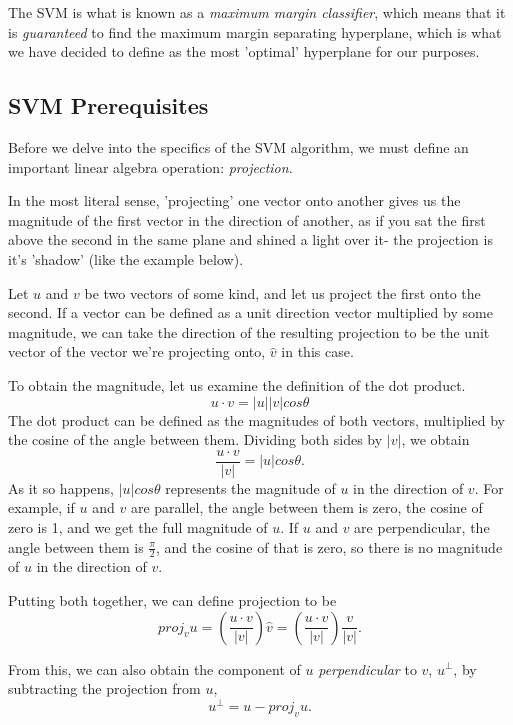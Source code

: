 The SVM is what is known as a \textit{maximum margin classifier}, which means that it is \textit{guaranteed} to find the maximum margin separating hyperplane, which is what we have decided to define as the most 'optimal' hyperplane for our purposes.

\subsection{SVM Prerequisites}
Before we delve into the specifics of the SVM algorithm, we must define an important linear algebra operation: \textit{projection}.

In the most literal sense, 'projecting' one vector onto another gives us the magnitude of the first vector in the direction of another, as if you sat the first above the second in the same plane and shined a light over it- the projection is it's 'shadow' (like the example below).


Let $u$ and $v$ be two vectors of some kind, and let us project the first onto the second. If a vector can be defined as a unit direction vector multiplied by some magnitude, we can take the direction of the resulting projection to be the unit vector of the vector we're projecting onto, $\hat{v}$ in this case.

To obtain the magnitude, let us examine the definition of the dot product.
\[
    u \cdot v = |u||v|cos\theta
\]
The dot product can be defined as the magnitudes of both vectors, multiplied by the cosine of the angle between them. Dividing both sides by $|v|$, we obtain
\[
    \frac{u \cdot v}{|v|} = |u|cos\theta.
\]
As it so happens, $|u|cos\theta$ represents the magnitude of $u$ in the direction of $v$. For example, if $u$ and $v$ are parallel, the angle between them is zero, the cosine of zero is 1, and we get the full magnitude of $u$. If $u$ and $v$ are perpendicular, the angle between them is $\frac{\pi}{2}$, and the cosine of that is zero, so there is no magnitude of $u$ in the direction of $v$.

Putting both together, we can define projection to be
\[
    proj_vu = (\frac{u \cdot v}{|v|})\hat{v} = (\frac{u \cdot v}{|v|})\frac{v}{|v|}.
\]

From this, we can also obtain the component of $u$ \textit{perpendicular} to $v$, $u^\perp$, by subtracting the projection from $u$,
\[
    u^\perp = u - proj_vu.
\]

